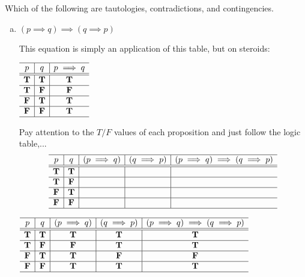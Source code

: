 \newpage
\begin{problem}
Which of the following are tautologies, contradictions, and contingencies.
\begin{enumerate}[a.]
\item $(p \implies q) \implies (q \implies p)$

This equation is simply an application of this table, but on steroids:

   $\begin{array}{c|c|c}
  \hline  
  p & q & p\implies q\\
  \hline
  \hline
 \mathbf{T} &  \mathbf{T} &  \mathbf{T}\\
  \hline
 \mathbf{T} &  \mathbf{F} &  \mathbf{F}\\
  \hline
 \mathbf{F} &  \mathbf{T} &  \mathbf{T}\\
  \hline
 \mathbf{F} &  \mathbf{F} &  \mathbf{T}\\
    \hline
    \end{array}$
    
Pay attention to the $T/F$ values of each proposition and just follow the logic table,...
 $$\begin{array}{c|c|c|c|c}
  \hline  
  p & q &(p \implies q)	& (q \implies p)	&(p \implies q) \implies (q \implies p) \\
  \hline
  \hline
 \mathbf{T} &  \mathbf{T} 	& 	& 	& 	\\
  \hline
 \mathbf{T} &  \mathbf{F} 	&  	&  	& 	\\
  \hline
 \mathbf{F} &  \mathbf{T} 	&  	&  	&  	\\
   \hline
 \mathbf{F} &  \mathbf{F} 	&  	&   	&  	\\
    \hline
    \end{array}$$



\ifKey
\color{red}
\hfill\begin{minipage}{0.75\textwidth}
 $\begin{array}{c|c|c|c|c}
  \hline  
  p & q &(p \implies q)	& (q \implies p)	&(p \implies q) \implies (q \implies p) \\
  \hline
  \hline
 \mathbf{T} &  \mathbf{T} 	&  \mathbf{T} 	&  \mathbf{T} 	&  \mathbf{T} 	\\
  \hline
 \mathbf{T} &  \mathbf{F} 	&  \mathbf{F}  	&  \mathbf{T} 	&  \mathbf{T} 	\\
  \hline
 \mathbf{F} &  \mathbf{T} 	&  \mathbf{T}  	&  \mathbf{F} 	&  \mathbf{F} 	\\
   \hline
 \mathbf{F} &  \mathbf{F} 	&  \mathbf{T}  	&  \mathbf{T} 	&  \mathbf{T} 	\\
    \hline
    \end{array}$
    

\end{minipage}
\end{enumerate}
\end{problem}
